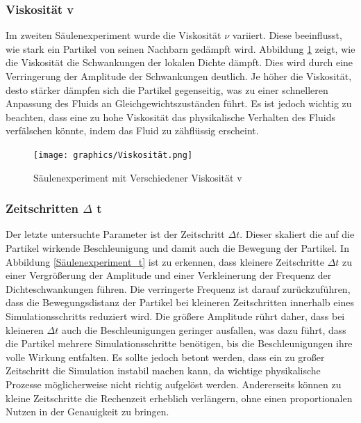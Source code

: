 \documentclass[a4paper, 12pt]{article}
\begin{document}
\subsubsection{Viskosität v}
Im zweiten Säulenexperiment wurde die Viskosität \(\nu\) variiert. Diese beeinflusst, wie stark ein Partikel von seinen Nachbarn gedämpft wird. Abbildung \ref{Säulenexperiment_v} zeigt, wie die Viskosität die Schwankungen der lokalen Dichte dämpft. Dies wird durch eine Verringerung der Amplitude der Schwankungen deutlich. Je höher die Viskosität, desto stärker dämpfen sich die Partikel gegenseitig, was zu einer schnelleren Anpassung des Fluids an Gleichgewichtszuständen führt. Es ist jedoch wichtig zu beachten, dass eine zu hohe Viskosität das physikalische Verhalten des Fluids verfälschen könnte, indem das Fluid zu zähflüssig erscheint.

\begin{figure}[H]
	\centering
	\texttt{[image: graphics/Viskosität.png]}	
	\caption{Säulenexperiment mit Verschiedener Viskosität v}
	\label{Säulenexperiment_v}
\end{figure}

\subsubsection{Zeitschritten $\Delta$ t}
Der letzte untersuchte Parameter ist der Zeitschritt \(\Delta t\). Dieser skaliert die auf die Partikel wirkende Beschleunigung und damit auch die Bewegung der Partikel. In Abbildung \ref{Säulenexperiment_t} ist zu erkennen, dass kleinere Zeitschritte \(\Delta t\) zu einer Vergrößerung der Amplitude und einer Verkleinerung der Frequenz der Dichteschwankungen führen. Die verringerte Frequenz ist darauf zurückzuführen, dass die Bewegungsdistanz der Partikel bei kleineren Zeitschritten innerhalb eines Simulationsschritts reduziert wird. Die größere Amplitude rührt daher, dass bei kleineren \(\Delta t\) auch die Beschleunigungen geringer ausfallen, was dazu führt, dass die Partikel mehrere Simulationsschritte benötigen, bis die Beschleunigungen ihre volle Wirkung entfalten. Es sollte jedoch betont werden, dass ein zu großer Zeitschritt die Simulation instabil machen kann, da wichtige physikalische Prozesse möglicherweise nicht richtig aufgelöst werden. Andererseits können zu kleine Zeitschritte die Rechenzeit erheblich verlängern, ohne einen proportionalen Nutzen in der Genauigkeit zu bringen.
\end{document}
